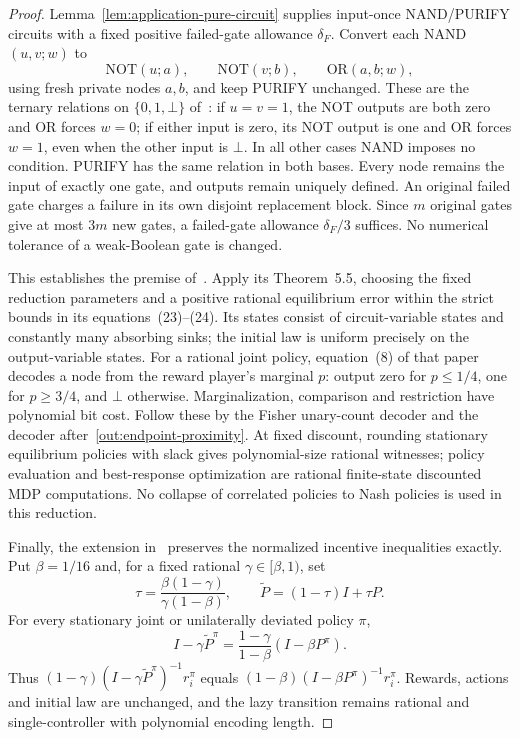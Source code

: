 \begin{proof}
Lemma~\ref{lem:application-pure-circuit} supplies input-once
NAND/PURIFY circuits with a fixed positive failed-gate allowance
$\delta_F$. Convert each NAND$(u,v;w)$ to
\[
 \mathrm{NOT}(u;a),\qquad \mathrm{NOT}(v;b),\qquad
 \mathrm{OR}(a,b;w),
\]
using fresh private nodes $a,b$, and keep PURIFY unchanged.
These are the ternary relations on $\{0,1,\bot\}$
of~\cite[Definition~2.6]{FKPP2026}: if $u=v=1$, the NOT outputs are
both zero and OR forces $w=0$; if either input is zero, its NOT output
is one and OR forces $w=1$, even when the other input is $\bot$.
In all other cases NAND imposes no condition. PURIFY has the same
relation in both bases.
Every node remains the input of exactly one gate, and outputs remain
uniquely defined. An original failed gate charges a failure in its own
disjoint replacement block. Since $m$ original gates give at most $3m$
new gates, a failed-gate allowance $\delta_F/3$ suffices. No numerical
tolerance of a weak-Boolean gate is changed.

This establishes the premise of~\cite[Conjecture~1]{FKPP2026}.
Apply its Theorem~5.5, choosing the fixed reduction parameters and a
positive rational equilibrium error within the strict bounds in its
equations~(23)--(24). Its states consist of circuit-variable states
and constantly many absorbing sinks; the initial law is uniform
precisely on the output-variable states. For a rational joint policy,
equation~(8) of that paper decodes a node from the reward player's
marginal $p$: output zero for $p\leq1/4$, one for $p\geq3/4$, and
$\bot$ otherwise. Marginalization, comparison and restriction have
polynomial bit cost. Follow these by the Fisher unary-count decoder
and the decoder after~\eqref{out:endpoint-proximity}.
At fixed discount, rounding stationary equilibrium policies with
slack gives polynomial-size rational witnesses; policy evaluation and
best-response optimization are rational finite-state discounted MDP
computations. No collapse of correlated policies to Nash policies is
used in this reduction.

Finally, the extension in~\cite[Remark~5.7]{FKPP2026} preserves the
normalized incentive inequalities exactly. Put $\beta=1/16$ and, for
a fixed rational $\gamma\in[\beta,1)$, set
\[
 \tau=\frac{\beta(1-\gamma)}{\gamma(1-\beta)},\qquad
 \widetilde P=(1-\tau)I+\tau P.
\]
For every stationary joint or unilaterally deviated policy $\pi$,
\[
 I-\gamma\widetilde P^\pi
 =\frac{1-\gamma}{1-\beta}(I-\beta P^\pi).
\]
Thus $(1-\gamma)(I-\gamma\widetilde P^\pi)^{-1}r_i^\pi$
equals $(1-\beta)(I-\beta P^\pi)^{-1}r_i^\pi$.
Rewards, actions and initial law are unchanged, and the lazy transition
remains rational and single-controller with polynomial encoding length.
\end{proof}

